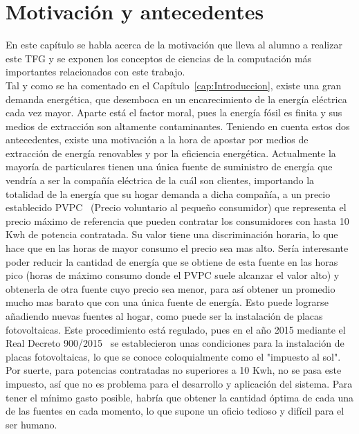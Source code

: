 \chapter{Motivación y antecedentes}
\label{cap:Antecedentes}
En este capítulo se habla acerca de la motivación que lleva al alumno a realizar este \gls{TFG} y se exponen los conceptos de ciencias de la computación más importantes relacionados con este trabajo.\\

Tal y como se ha comentado en el Capítulo~\ref{cap:Introduccion}, existe una gran demanda energética, que desemboca en un encarecimiento de la energía eléctrica cada vez mayor. Aparte está el factor moral, pues la energía fósil es finita y sus medios de extracción son altamente contaminantes. Teniendo en cuenta estos dos antecedentes, existe una motivación a la hora de apostar por medios de extracción de energía renovables y por la eficiencia energética. Actualmente la mayoría de particulares tienen una única fuente de suministro de energía que vendría a ser la compañía eléctrica de la cuál son clientes, importando la totalidad de la energía que su hogar demanda a dicha compañía, a un precio establecido \gls{PVPC}~\cite{Ree14} (Precio voluntario al pequeño consumidor) que representa el precio máximo de referencia que pueden contratar los consumidores con hasta 10 Kwh de potencia contratada. Su valor tiene una discriminación horaria, lo que hace que en las horas de mayor consumo el precio sea mas alto. Sería interesante poder reducir la cantidad de energía que se obtiene de esta fuente en las horas pico (horas de máximo consumo donde el \gls{PVPC} suele alcanzar el valor alto) y obtenerla de otra fuente cuyo precio sea menor, para así obtener un promedio mucho mas barato que con una única fuente de energía. Esto puede lograrse añadiendo nuevas fuentes al hogar, como puede ser la instalación de placas fotovoltaicas. Este procedimiento está regulado, pues en el año 2015 mediante el Real Decreto 900/2015~\cite{Boe15} se establecieron unas condiciones para la instalación de placas fotovoltaicas, lo que se conoce coloquialmente como el "impuesto al sol". Por suerte, para potencias contratadas no superiores a 10 Kwh, no se pasa este impuesto, así que no es problema para el desarrollo y aplicación del sistema. Para tener el mínimo gasto posible, habría que obtener la cantidad óptima de cada una de las fuentes en cada momento, lo que supone un oficio tedioso y difícil para el ser humano.\\

